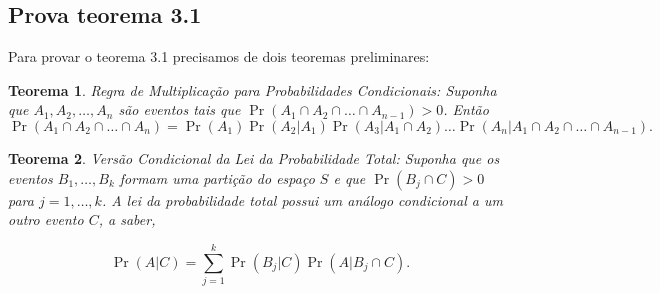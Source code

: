 \documentclass[12pt]{article}
\theoremstyle{break}
\newtheorem{theorem}{Teorema}[section]
\begin{document}
\subsection{Prova teorema 3.1}

Para provar o teorema 3.1 precisamos de dois teoremas preliminares:


\begin{theorem}  Regra de Multiplicação para Probabilidades Condicionais:
Suponha que \( A_1, A_2, \dots, A_n \) são eventos tais que \( \Pr(A_1 \cap A_2 \cap \dots \cap A_{n-1}) > 0 \). Então
\[
\Pr(A_1 \cap A_2 \cap \dots \cap A_n) = \Pr(A_1) \Pr(A_2 | A_1) \Pr(A_3 | A_1 \cap A_2) \dots \Pr(A_n | A_1 \cap A_2 \cap \dots \cap A_{n-1}).
\]
\end{theorem}


\begin{theorem}
    Versão Condicional da Lei da Probabilidade Total: Suponha que os eventos \( B_1, \dots, B_k \) formam uma partição do espaço \( S \) e que \( \Pr(B_j \cap C) > 0 \) para \( j = 1, \dots, k \). A lei da probabilidade total possui um análogo condicional a um outro evento \( C \), a saber,

\[
\Pr(A | C) = \sum_{j=1}^{k} \Pr(B_j | C) \Pr(A | B_j \cap C).
\]
\end{theorem}









\end{document}
